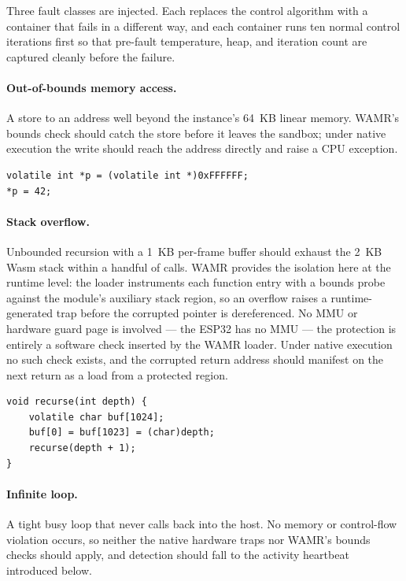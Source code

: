 \documentclass[12pt, a4paper]{report}
\begin{document}
Three fault classes are injected. Each replaces the control algorithm with a container that fails in a different way, and each container runs ten normal control iterations first so that pre-fault temperature, heap, and iteration count are captured cleanly before the failure.

\paragraph{Out-of-bounds memory access.} A store to an address well beyond the instance's 64~KB linear memory. WAMR's bounds check should catch the store before it leaves the sandbox; under native execution the write should reach the address directly and raise a CPU exception.

\begin{lstlisting}[style=csnippet,caption={OOB memory access (\texttt{fault\_null\_ptr.c}).},label={lst:fault-oob}]
volatile int *p = (volatile int *)0xFFFFFF;
*p = 42;
\end{lstlisting}

\paragraph{Stack overflow.} Unbounded recursion with a 1~KB per-frame buffer should exhaust the 2~KB Wasm stack within a handful of calls. WAMR provides the isolation here at the runtime level: the loader instruments each function entry with a bounds probe against the module's auxiliary stack region, so an overflow raises a runtime-generated trap before the corrupted pointer is dereferenced. No MMU or hardware guard page is involved --- the ESP32 has no MMU --- the protection is entirely a software check inserted by the WAMR loader. Under native execution no such check exists, and the corrupted return address should manifest on the next return as a load from a protected region.

\begin{lstlisting}[style=csnippet,caption={Recursive stack overflow (\texttt{fault\_overflow.c}).},label={lst:fault-overflow}]
void recurse(int depth) {
    volatile char buf[1024];
    buf[0] = buf[1023] = (char)depth;
    recurse(depth + 1);
}
\end{lstlisting}

\paragraph{Infinite loop.} A tight busy loop that never calls back into the host. No memory or control-flow violation occurs, so neither the native hardware traps nor WAMR's bounds checks should apply, and detection should fall to the activity heartbeat introduced below.
\end{document}
